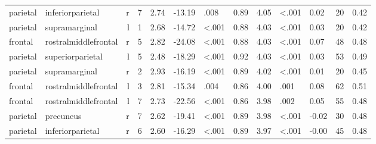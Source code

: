 \documentclass{article}
\begin{document}
\begin{longtable}{llrR{1.3cm}R{1cm}R{1.3cm}R{1cm}R{1cm}R{1.3cm}R{1cm}R{1.8cm}R{1.3cm}R{1.8cm}}
  parietal &          inferiorparietal &    r &         7 &                  2.74 &           -13.19 &               .008 &                               0.89 &                          4.05 &                   \textless.001 &   0.02 &     20 &      0.42 \\
  parietal &             supramarginal &    l &         1 &                  2.68 &           -14.72 &      \textless.001 &                               0.88 &                          4.03 &                   \textless.001 &   0.03 &     20 &      0.42 \\
   frontal &      rostralmiddlefrontal &    r &         5 &                  2.82 &           -24.08 &      \textless.001 &                               0.88 &                          4.03 &                   \textless.001 &   0.07 &     48 &      0.48 \\
  parietal &          superiorparietal &    l &         5 &                  2.48 &           -18.29 &      \textless.001 &                               0.92 &                          4.03 &                   \textless.001 &   0.03 &     53 &      0.49 \\
  parietal &             supramarginal &    r &         2 &                  2.93 &           -16.19 &      \textless.001 &                               0.89 &                          4.02 &                   \textless.001 &   0.01 &     20 &      0.45 \\
   frontal &      rostralmiddlefrontal &    l &         3 &                  2.81 &           -15.34 &               .004 &                               0.86 &                          4.00 &                            .001 &   0.08 &     62 &      0.51 \\
   frontal &      rostralmiddlefrontal &    l &         7 &                  2.73 &           -22.56 &      \textless.001 &                               0.86 &                          3.98 &                            .002 &   0.05 &     55 &      0.48 \\
  parietal &                 precuneus &    r &         7 &                  2.62 &           -19.41 &      \textless.001 &                               0.89 &                          3.98 &                   \textless.001 &  -0.02 &     30 &      0.48 \\
  parietal &          inferiorparietal &    r &         6 &                  2.60 &           -16.29 &      \textless.001 &                               0.89 &                          3.97 &                   \textless.001 &  -0.00 &     45 &      0.48 \\

\end{longtable}
\end{document}
